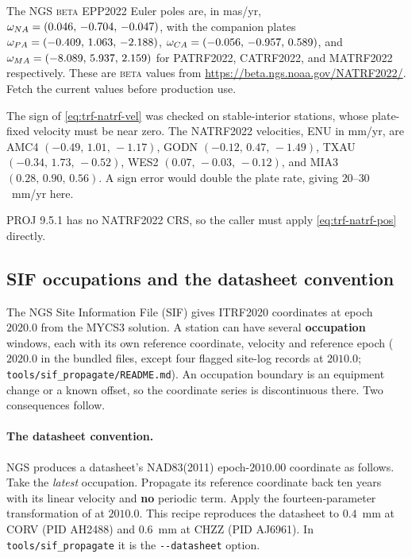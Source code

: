 \documentclass[main.tex]{subfiles}
\begin{document}
The NGS \textsc{beta} EPP2022 Euler poles are, in mas/yr,
$\omega_{NA} = (0.046,\,-0.704,\,-0.047)$, with the companion
plates $\omega_{PA} = (-0.409,\,1.063,\,-2.188)$,
$\omega_{CA} = (-0.056,\,-0.957,\,0.589)$, and
$\omega_{MA} = (-8.089,\,5.937,\,2.159)$ for PATRF2022,
CATRF2022, and MATRF2022 respectively.  These are \textsc{beta} values
from \url{https://beta.ngs.noaa.gov/NATRF2022/}.  Fetch the current
values before production use.

The sign of \eqref{eq:trf-natrf-vel} was checked on stable-interior
stations, whose plate-fixed velocity must be near zero.  The NATRF2022
velocities, ENU in mm/yr, are AMC4 $(-0.49,\,1.01,\,-1.17)$,
GODN $(-0.12,\,0.47,\,-1.49)$, TXAU $(-0.34,\,1.73,\,-0.52)$,
WES2 $(0.07,\,-0.03,\,-0.12)$, and MIA3 $(0.28,\,0.90,\,0.56)$.  A sign
error would double the plate rate, giving $20$--$30$~mm/yr here.

PROJ 9.5.1 has no NATRF2022 CRS, so the caller must apply
\eqref{eq:trf-natrf-pos} directly.

\subsection{SIF occupations and the datasheet convention}\label{sec:trf-sif}

The NGS Site Information File (SIF) gives ITRF2020 coordinates at epoch
$2020.0$ from the MYCS3 solution.  A station can have several
\textbf{occupation} windows, each with its own reference coordinate,
velocity and reference epoch ($2020.0$ in the bundled files, except four
flagged site-log records at $2010.0$;
\texttt{tools/sif\_propagate/README.md}).  An occupation boundary is an equipment change or a known
offset, so the coordinate series is discontinuous there.  Two
consequences follow.

\paragraph{The datasheet convention.}  NGS produces a datasheet's
NAD83(2011) epoch-$2010.00$ coordinate as follows.  Take the
\emph{latest} occupation.  Propagate its reference coordinate back ten
years with its linear velocity and \textbf{no} periodic term.  Apply
the fourteen-parameter transformation of  at
$2010.0$.  This recipe reproduces the datasheet to $0.4$~mm at CORV
(PID AH2488) and $0.6$~mm at CHZZ (PID AJ6961).  In
\texttt{tools/sif\_propagate} it is the \texttt{-{}-datasheet} option.
\end{document}
